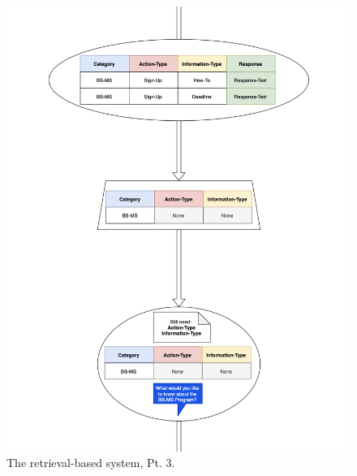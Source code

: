 \documentclass[titlepage, 12pt]{article}
\begin{document}
\begin{figure}[p]
    \centering\includegraphics[width=1\linewidth]{images/retrieval-3.png}
    \caption{The retrieval-based system, Pt. 3.}
\end{figure}
\end{document}
